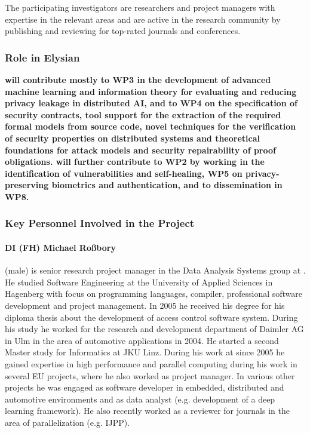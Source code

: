\documentclass[a4paper,11pt]{article}
\begin{document}
The participating investigators are researchers and project managers with expertise in the relevant areas and are active in the research community by publishing and reviewing for top-rated journals and conferences.

\vspace{10pt}
\subsubsection*{Role in Elysian}
\textbf{\SCCH{} 
will contribute mostly to WP3 in the development of advanced machine learning and information theory 
for evaluating and reducing privacy leakage in distributed AI, and to %
WP4 on the specification of security contracts, tool support for the extraction of the required formal models from source code, novel techniques for the verification of security properties on distributed systems and theoretical foundations for attack models and security repairability of proof obligations. \SCCH{} will further contribute to WP2 by working in the identification of vulnerabilities and self-healing, 
WP5 on privacy-preserving biometrics and authentication, and to dissemination in WP8.  }



\vspace{10pt}
\subsubsection*{Key Personnel Involved in the Project}

\paragraph{DI (FH) Michael Roßbory} (male) is senior research project manager in the Data Analysis Systems group at \SCCHshort{}. He studied Software Engineering at the University of Applied Sciences in Hagenberg with focus on programming languages, compiler, professional software development and project management. In 2005 he received his degree for his diploma thesis about the development of access control software system. During his study he worked for the research and development department of Daimler AG in Ulm in the area of automotive applications in 2004. He started a second Master study for Informatics at JKU Linz. During his work at \SCCHshort{} since 2005 he gained expertise in high performance and parallel computing during his work in several EU projects, where he also worked as project manager. In various other projects he was engaged as software developer in embedded, distributed and automotive environments and as data analyst (e.g. development of a deep learning framework). He also recently worked as a reviewer for journals in the area of parallelization (e.g. IJPP).
\end{document}

